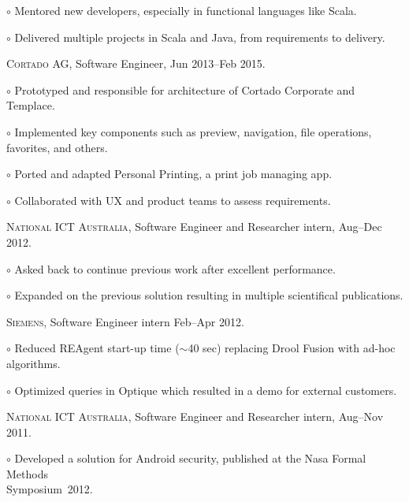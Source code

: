\documentclass[letterpaper]{article}
\renewenvironment{itemize}{
  \begin{list}{}{
    \setlength{\leftmargin}{1.5em}
  }
}{
  \end{list}
}
\newenvironment{no-indent-itemize}{
  \begin{list}{}{
    \setlength{\leftmargin}{0em}
  }
}{
  \end{list}
}
\def\tilde{$\scriptstyle\sim$}
\def\bullet{$\circ$\xspace}
\begin{document}
\begin{no-indent-itemize}
\begin{itemize}
    \item\bullet Mentored new developers, especially in functional languages like Scala.
    \item\bullet Delivered multiple projects in Scala and Java, from requirements to delivery.
  \end{itemize}
  \item \textsc{Cortado AG}, Software Engineer, Jun 2013--Feb 2015.
  \begin{itemize}
    \item\bullet Prototyped and responsible for architecture of Cortado Corporate and Templace.
    \item\bullet Implemented key components such as preview, navigation, file operations, favorites, and others.
    \item\bullet Ported and adapted Personal Printing, a print job managing app.
    \item\bullet Collaborated with UX and product teams to assess requirements.
  \end{itemize}
  \item \textsc{National ICT Australia}, Software Engineer and Researcher intern, Aug--Dec 2012. 
  \begin{itemize}
    \item\bullet Asked back to continue previous work after excellent performance.
    \item\bullet Expanded on the previous solution resulting in multiple scientifical publications.
  \end{itemize}
  \item \textsc{Siemens}, Software Engineer intern Feb--Apr 2012.
  \begin{itemize}
    \item\bullet Reduced REAgent start-up time (\tilde 40 sec) replacing Drool Fusion with 
          ad-hoc algorithms.
    \item\bullet Optimized queries in Optique which resulted in a demo for external customers.
  \end{itemize}
  \item \textsc{National ICT Australia}, Software Engineer and Researcher intern, Aug--Nov 2011. 
  \begin{itemize}
    \item\bullet Developed a solution for Android security, published at the Nasa Formal Methods \\
    \phantom{\bullet }Symposium~2012.
  \end{itemize}
\end{no-indent-itemize}
\end{document}

